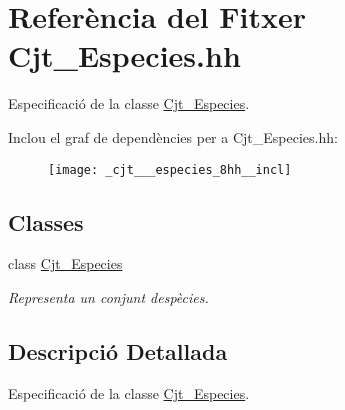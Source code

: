 \hypertarget{_cjt___especies_8hh}{}\section{Referència del Fitxer Cjt\+\_\+\+Especies.\+hh}
\label{_cjt___especies_8hh}


Especificació de la classe \hyperlink{class_cjt___especies}{Cjt\+\_\+\+Especies}.  


Inclou el graf de dependències per a Cjt\+\_\+\+Especies.\+hh\+:\nopagebreak
\begin{figure}[H]
\begin{center}
\leavevmode
\texttt{[image: \_cjt\_\_\_especies\_8hh\_\_incl]}
\end{center}
\end{figure}
\subsection*{Classes}
\begin{DoxyCompactItemize}
\item 
class \hyperlink{class_cjt___especies}{Cjt\+\_\+\+Especies}
\begin{DoxyCompactList}\small\item\em Representa un conjunt d\textquotesingle{}espècies. \end{DoxyCompactList}\end{DoxyCompactItemize}


\subsection{Descripció Detallada}
Especificació de la classe \hyperlink{class_cjt___especies}{Cjt\+\_\+\+Especies}. 

